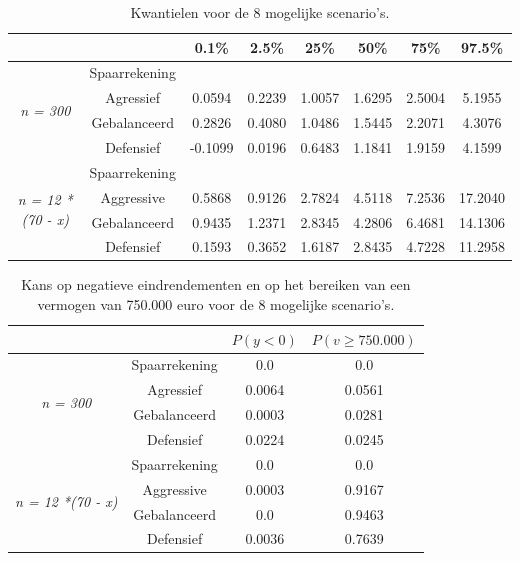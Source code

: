 \begin{table}[h]
\centering
\begin{tabular}{cc|cccccc}
\multicolumn{1}{l}{}                       &               & 0.1\%     & 2.5\%     & 25\%      & 50\%      & 75\%      & 97.5\%    \\ \hline
\multirow{4}{*}{\textit{n = 300}}          & Spaarrekening & \textit{} & \textit{} & \textit{} & \textit{} & \textit{} & \textit{} \\
                                           & Agressief    & 0.0594 & 0.2239 & 1.0057 & 1.6295 & 2.5004 & 5.1955 \\
                                           & Gebalanceerd  & 0.2826 & 0.4080 & 1.0486 & 1.5445 & 2.2071 & 4.3076 \\
                                           & Defensief     & -0.1099 & 0.0196 & 0.6483 & 1.1841 & 1.9159 & 4.1599 \\ \hline
\multirow{4}{*}{\textit{n = 12 *(70 - x)}} & Spaarrekening & \textit{} & \textit{} & \textit{} & \textit{} & \textit{} & \textit{} \\
                                           & Aggressive    & 0.5868 & 0.9126 & 2.7824 & 4.5118 & 7.2536 & 17.2040 \\
                                           & Gebalanceerd  & 0.9435 & 1.2371 & 2.8345 & 4.2806 & 6.4681 &14.1306 \\
                                           & Defensief     & 0.1593 & 0.3652 & 1.6187 & 2.8435 & 4.7228 & 11.2958
\end{tabular}
\caption{Kwantielen voor de 8 mogelijke scenario's.}
\label{tab:op12a}
\end{table}

\begin{table}[h]
\centering
\begin{tabular}{cc|c|c}
\multicolumn{1}{l}{}                       &               & $P(y<0)$     & $P(v\geq 750.000)$      \\ \hline
\multirow{4}{*}{\textit{n = 300}}          & Spaarrekening & 0.0 & 0.0  \\
                                           & Agressief    & 0.0064 & 0.0561 \\
                                           & Gebalanceerd  & 0.0003 & 0.0281 \\
                                           & Defensief     & 0.0224& 0.0245 \\ \hline
\multirow{4}{*}{\textit{n = 12 *(70 - x)}} & Spaarrekening & 0.0 & 0.0  \\
                                           & Aggressive    & 0.0003 & 0.9167  \\
                                           & Gebalanceerd  & 0.0 & 0.9463 \\
                                           & Defensief     & 0.0036 & 0.7639 
\end{tabular}
\caption{Kans op negatieve eindrendementen en op het bereiken van een vermogen van 750.000 euro voor de 8 mogelijke scenario's.}
\label{tab:op12b}
\end{table}
